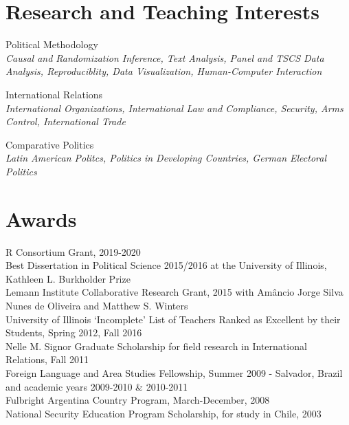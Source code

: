 \documentclass[margin, 10pt]{CVStyleTemplate}\usepackage[]{graphicx}\usepackage[]{color}
\begin{document}
\begin{resume}


\section{Research and Teaching Interests}

Political Methodology\\
\emph{Causal and Randomization Inference, Text Analysis, Panel and TSCS Data Analysis, Reproduciblity, Data Visualization, Human-Computer Interaction}

International Relations\\
\emph{International Organizations, International Law and Compliance, Security, Arms Control, International Trade}

Comparative Politics\\
\emph{Latin American Politcs, Politics in Developing Countries, German Electoral Politics}

\section{Awards}%

R Consortium Grant, 2019-2020\\[6pt]
Best Dissertation in Political Science 2015/2016 at the University of Illinois, Kathleen L. Burkholder Prize  \\[6pt]
Lemann Institute Collaborative Research Grant, 2015 with Am\^{a}ncio Jorge Silva Nunes de Oliveira and Matthew S. Winters\\[6pt]%
University of Illinois `Incomplete' List of Teachers Ranked as Excellent by their Students, Spring 2012, Fall 2016\\[6pt]%
Nelle M. Signor Graduate Scholarship for field research in International Relations, Fall 2011\\[6pt]%
Foreign Language and Area Studies Fellowship, Summer 2009 - Salvador, Brazil and academic years 2009-2010 \& 2010-2011\\[6pt]%
Fulbright Argentina Country Program, March-December, 2008\\[6pt]%
National Security Education Program Scholarship, for study in Chile, 2003\\[6pt]%





\end{resume}
\end{document}
